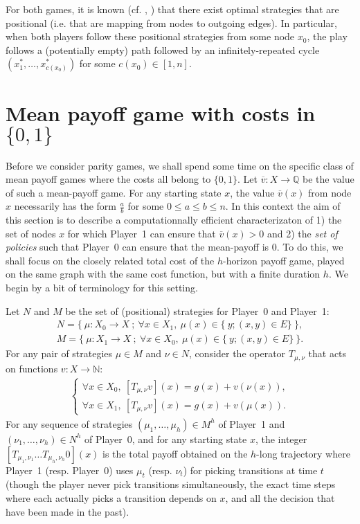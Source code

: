 \documentclass{article}
\def\N{\mathbb N}
\def\Q{\mathbb Q}
\def\v{\overline v}
\def\pa{Player~0}
\def\pb{Player~1}
\begin{document}
For both games, it is known (cf. \citet{zielonka98}, \citet{ehrenfeucht79}) that there exist optimal strategies that are positional (i.e. that are mapping from nodes to outgoing edges). In particular, when both players follow these positional strategies from some node $x_0$, the play follows a (potentially empty) path followed by an infinitely-repeated cycle $(x^*_1,\dots,x^*_{c(x_0)})$ for some $c(x_0) \in [1,n]$.



\section{Mean payoff game with costs in $\{0,1\}$}

Before we consider parity games, we shall spend some time on the specific class of mean payoff games where the costs all belong to $\{0,1\}$. Let $\v:X \to \Q$ be the value of such a mean-payoff game. For any starting state $x$, the value $\v(x)$ from node $x$ necessarily has the form $\frac{a}{b}$ for some $0 \le a \le b \le n$. In this context the aim of this section is to describe a computationnally efficient characterizaton of 1) the set of nodes $x$ for which \pb{ }can ensure that $\v(x)>0$ and 2) the \emph{set of policies} such that \pa{ }can ensure that the mean-payoff is $0$. To do this, we shall focus on the closely related total cost of the $h$-horizon payoff game, played on the same graph with the same cost function, but with a finite duration $h$. We begin by a bit of terminology for this setting.

Let $N$ and $M$ be the set of (positional) strategies for \pa{ }and \pb:
\begin{align}
  N = \{~ \mu:X_0 \to X ~;~ \forall x \in X_1,~ \mu(x) \in \{~ y;(x,y) \in E\} ~\},\\
  M = \{~ \mu:X_1 \to X ~;~ \forall x \in X_0,~ \mu(x) \in \{~ y;(x,y) \in E\} ~\}.
\end{align}
For any pair of strategies $\mu \in M$ and $\nu \in N$, consider the operator $T_{\mu,\nu}$ that acts on functions $v:X \to \N$:
\begin{align}
  \left\{\begin{array}{l}
  \forall x \in X_0,~ [T_{\mu,\nu}v](x) = g(x) + v(\nu(x)), \\
  \forall x \in X_1,~ [T_{\mu,\nu}v](x)= g(x) + v(\mu(x)).
  \end{array}\right.
\end{align}
For any sequence of strategies $(\mu_1,\dots,\mu_h) \in M^h$ of \pb{ }and $(\nu_1,\dots,\nu_h) \in N^h$ of \pa, and for any starting state $x$, the integer $[T_{\mu_1,\nu_1} \dots T_{\mu_h,\nu_h}0](x)$ is the total payoff obtained on the $h$-long trajectory where \pb{ } (resp. \pa) uses $\mu_t$ (resp. $\nu_t$) for picking transitions at time $t$ (though the player never pick transitions simultaneously, the exact time steps where each actually picks a transition depends on $x$, and all the decision that have been made in the past).
\end{document}
